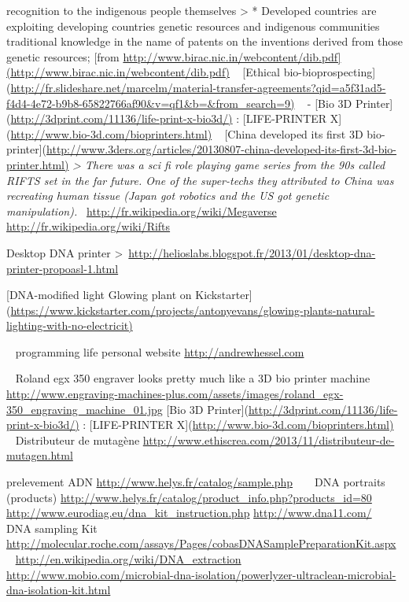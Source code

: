 recognition to the indigenous people themselves
{\textgreater} * Developed countries are exploiting developing countries
genetic resources and indigenous communities traditional knowledge in
the name of patents on the inventions derived from those genetic
resources;
[from
\href{http://www.birac.nic.in/webcontent/dib.pdf](http://www.birac.nic.in/webcontent/dib.pdf)}{http://www.birac.nic.in/webcontent/dib.pdf](http://www.birac.nic.in/webcontent/dib.pdf)}
~
[Ethical
bio-bioprospecting](\url{http://fr.slideshare.net/marcelm/material-transfer-agreements?qid=a5f31ad5-f4d4-4e72-b9b8-65822766af90&v=qf1&b=&from_search=9)}
~
{}-
[Bio 3D Printer](\url{http://3dprint.com/11136/life-print-x-bio3d/)} :
[LIFE-PRINTER X](\url{http://www.bio-3d.com/bioprinters.html)}
~
[China developed its first 3D
bio-printer](\url{http://www.3ders.org/articles/20130807-china-developed-its-first-3d-bio-printer.html)}
\textit{{\textgreater} There was a sci fi role playing game
series from the 90{\textquotesingle}s called RIFTS set in the far
future. One of the super-techs they attributed to China was recreating
human tissue (Japan got robotics and the US got genetic
manipulation).~}
\url{http://fr.wikipedia.org/wiki/Megaverse}
\url{http://fr.wikipedia.org/wiki/Rifts}

\bigskip
Desktop DNA printer
{\textgreater}~\url{http://helioslabs.blogspot.fr/2013/01/desktop-dna-printer-propoasl-1.html}

\bigskip

[DNA-modified light Glowing plant on
Kickstarter](\url{https://www.kickstarter.com/projects/antonyevans/glowing-plants-natural-lighting-with-no-electricit)}

~
programming life personal website
\href{http://andrewhessel.com/}{http://andrewhessel.com}

\bigskip

~
Roland egx 350 engraver looks pretty much like a 3D bio printer machine
\url{http://www.engraving-machines-plus.com/assets/images/roland_egx-350_engraving_machine_01.jpg}
[Bio 3D Printer](\url{http://3dprint.com/11136/life-print-x-bio3d/)} :
[LIFE-PRINTER X](\url{http://www.bio-3d.com/bioprinters.html)}
~
Distributeur de mutag\`ene
\url{http://www.ethiscrea.com/2013/11/distributeur-de-mutagen.html}

\bigskip

prelevement ADN
\url{http://www.helys.fr/catalog/sample.php}
~
~
DNA portraits (products)
\url{http://www.helys.fr/catalog/product_info.php?products_id=80}
\url{http://www.eurodiag.eu/dna_kit_instruction.php}
\url{http://www.dna11.com/}
~
DNA sampling Kit
\url{http://molecular.roche.com/assays/Pages/cobasDNASamplePreparationKit.aspx}
~
\url{http://en.wikipedia.org/wiki/DNA_extraction}
\url{http://www.mobio.com/microbial-dna-isolation/powerlyzer-ultraclean-microbial-dna-isolation-kit.html}
